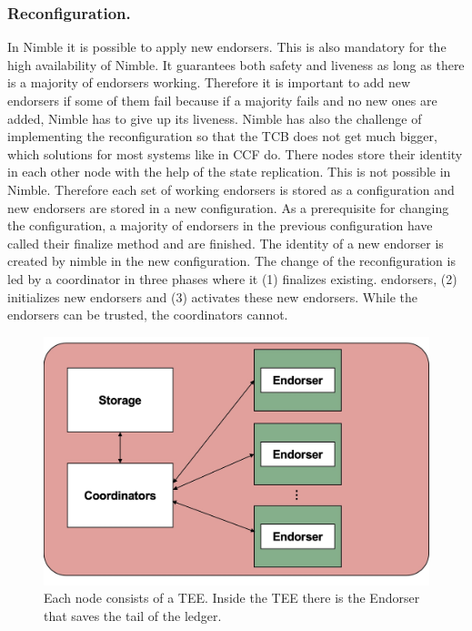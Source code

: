 	\subsubsection*{Reconfiguration.}
	In Nimble it is possible to apply new endorsers. This is also mandatory for the high availability of Nimble. It guarantees both safety and liveness as long as there is a majority of endorsers working. Therefore it is important to add new endorsers if some of them fail because if a majority fails and no new ones are added, Nimble has to give up its liveness. Nimble has also the challenge of implementing the reconfiguration so that the TCB does not get much bigger, which solutions for most systems like in CCF do. There nodes store their identity in each other node with the help of the state replication. This is not possible in Nimble. Therefore each set of working endorsers is stored as a configuration and new endorsers are stored in a new configuration. As a prerequisite for changing the configuration, a majority of endorsers in the previous configuration have called their finalize method and are finished. The identity of a new endorser is created by nimble in the new configuration. The change of the reconfiguration is led by a coordinator in three phases where it (1) finalizes existing. endorsers, (2) initializes new endorsers and (3) activates these new endorsers. While the endorsers can be trusted, the coordinators cannot. 
	
\begin{figure}[b]
	\includegraphics[scale=0.12]{pictures/nimble}
	\caption{Each node consists of a TEE. Inside the TEE there is the Endorser that saves the tail of the ledger.}
	\label{nimble}
\end{figure}
